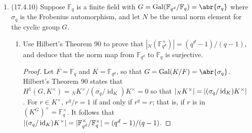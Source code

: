 \documentclass[11pt]{article}
\newcommand{\cbr}[1]{\left\{#1\right\}}
\DeclareMathOperator{\Gal}{Gal}
\DeclareMathOperator{\id}{id}
\DeclareMathOperator{\im}{im}
\DeclareMathOperator{\Hom}{Hom}
\DeclareMathOperator{\Ext}{Ext}
\begin{document}
\begin{enumerate}
\begin{proof}
        Now let $\cbr{P_i}$ be a projective resolution of $\mathbb{Z}G$-modules for $\mathbb{Z}$: \[\cdots\to P_n\to\cdots\to P_1\to P_0\to \mathbb{Z}\to 0\] Apply the $\Hom_{\mathbb{Z}G}(-,B)$ functor to obtain the cochain complex (removing the first group) \[0\to \Hom_{\mathbb{Z}G}(P_0,B)\xrightarrow{d_1} \Hom_{\mathbb{Z}G}(P_1,B)\xrightarrow{d_2}\cdots\xrightarrow{d_n} \Hom_{\mathbb{Z}G}(P_n,B)\xrightarrow{d_{n+1}}\cdots.\] The cohomology of this complex is given by the groups $\Ext_{\mathbb{Z}G}^i(\mathbb{Z},B) = \ker{d_{i+1}}/\im{d_i}$. Using the tensor-hom adjunction we produce isomorphisms $f_i\colon \Hom_{\mathbb{Z}G}(P_i,B)\to \Hom_\mathbb{Z}(P_i,A)$; produce the cochain complex (is still a cochain complex since the $f_i$ are isomorphisms) \[0\to \Hom_\mathbb{Z}(P_0,A)\xrightarrow{f_1d_1f_0^{-1}} \Hom_\mathbb{Z}(P_1,A)\xrightarrow{f_2d_2f_1^{-1}}\cdots\xrightarrow{f_nd_nf_{n-1}^{-1}} \Hom_\mathbb{Z}(P_n,A)\xrightarrow{f_{n+1}d_{n+1}f_n^{-1}}\cdots.\] The cohomology of this complex is isomorphic to the cohomology of the previous complex given since the $f_i$ are isomorphisms: we have $\ker{d_{i+1}}\cong \ker(f_{i+1}d_{i+1}f_i^{-1})$ and $\im{d_i}\cong \im(f_id_if_{i-1}^{-1})$. So $\Ext_{\mathbb{Z}G}^n(\mathbb{Z},B)\cong \Ext_\mathbb{Z}^n(\mathbb{Z},A)$ as needed. But for $n>0$, $\Ext_\mathbb{Z}^n(\mathbb{Z},A)$ since $\mathbb{Z}$ is a projective (free) $\mathbb{Z}$-module.
    \end{proof}
    \item (17.4.10) Suppose $\mathbb{F}_q$ is a finite field with $G= \Gal(\mathbb{F}_{q^d}/\mathbb{F}_q) = \abr{\sigma_q}$ where $\sigma_q$ is the Frobenius automorphism, and let $N$ be the usual norm element for the cyclic group $G$. \begin{enumerate}
        \item Use Hilbert's Theorem 90 to prove that $|{}_N(\mathbb{F}_{q^d}^\times)| = (q^d-1)/(q-1)$, and deduce that the norm map from $\mathbb{F}_{q^d}$ to $\mathbb{F}_q$ is surjective. \begin{proof}
        Let $F = \mathbb{F}_q$ and $K = \mathbb{F}_{q^d}$, so that $G = \Gal(K/F) = \abr{\sigma_q}$. Hilbert's Theorem 90 states that $H^1(G,K^\times) = {}_NK^\times/(\sigma_q/\id_K)K^\times = 0$ so that $\abs{{}_NK^\times} = \abs{(\sigma_q/\id_K)K^\times}$. For $r\in K^\times$, $r^q/r = 1$ if and only if $r^q = r$; that is, if $r$ is in $(K^G)^\times = \mathbb{F}_q^\times$. It follows that $\abs{(\sigma_q/\id_K)K^\times} = |\mathbb{F}_{q^d}^\times/\mathbb{F}_q^\times| = (q^d-1)/(q-1)$. 


\end{proof}
\end{enumerate}
\end{enumerate}
\end{document}

